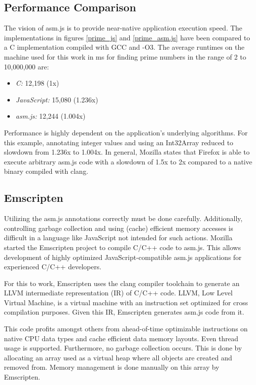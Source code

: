 \subsection{Performance Comparison}

The vision of asm.js is to provide near-native application execution speed. The implementations in figures \ref{prime_js} and \ref{prime_asm.js} have been compared to a C implementation compiled with GCC and -O3. The average runtimes on the machine used for this work in ms for finding prime numbers in the range of 2 to 10,000,000 are:

\begin{itemize}
\item \textit{C:} 12,198 (1x)
\item \textit{JavaScript:} 15,080 (1.236x)
\item \textit{asm.js:} 12,244 (1.004x)
\end{itemize}

Performance is highly dependent on the application's underlying algorithms. For this example, annotating integer values and using an Int32Array reduced to slowdown from 1.236x to 1.004x. In general, Mozilla states that Firefox is able to execute arbitrary asm.js code with a slowdown of 1.5x to 2x compared to a native binary compiled with clang. \cite{asm.js_spec} \cite{asm.js_comp}


\subsection{Emscripten}

Utilizing the asm.js annotations correctly must be done carefully. Additionally, controlling garbage collection and using (cache) efficient memory accesses is difficult in a language like JavaScript not intended for such actions. Mozilla started the Emscripten project to compile C/C++ code to asm.js. This allows development of highly optimized JavaScript-compatible asm.js applications for experienced C/C++ developers.

For this to work, Emscripten uses the clang compiler toolchain to generate an LLVM intermediate representation (IR) of C/C++ code. LLVM, Low Level Virtual Machine, is a virtual machine with an instruction set optimized for cross compilation purposes. Given this IR, Emscripten generates asm.js code from it.

This code profits amongst others from ahead-of-time optimizable instructions on native CPU data types and cache efficient data memory layouts. Even thread usage is supported. Furthermore, no garbage collection occurs. This is done by allocating an array used as a virtual heap where all objects are created and removed from. Memory management is done manually on this array by Emscripten. \cite{asm.js_spec}

